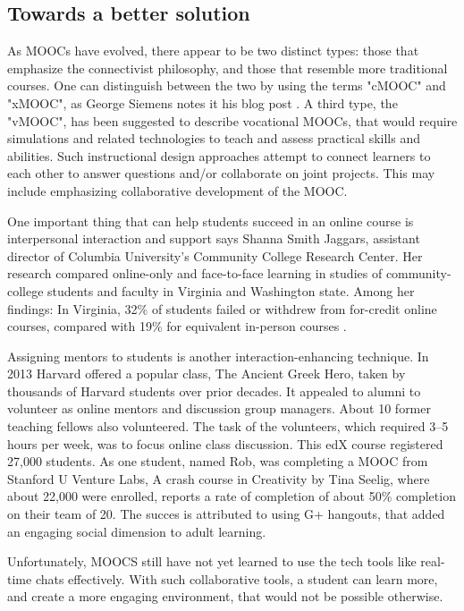 \subsection{Towards a better solution}
As MOOCs have evolved, there appear to be two distinct types: those that
emphasize the connectivist philosophy, and those that resemble more traditional
courses. One can distinguish between the two by using the terms "cMOOC" and
"xMOOC", as George Siemens notes it his blog post \citep{moocs_are_a_platform}.
A third type, the "vMOOC", has been suggested to describe
vocational MOOCs, that would require simulations and related technologies to
teach and assess practical skills and abilities.
Such instructional design approaches attempt to connect learners to each other
to answer questions and/or collaborate on joint projects. This may include
emphasizing collaborative development of the MOOC.

One important thing that can help students succeed in an online course is
interpersonal interaction and support says Shanna Smith Jaggars, assistant
director of Columbia University's Community College Research Center. Her
research compared online-only and face-to-face learning in studies of
community-college students and faculty in Virginia and Washington state. Among
her findings: In Virginia, 32\% of students failed or withdrew from for-credit
online courses, compared with 19\% for equivalent in-person courses \citep{early_report_on_moocs}.

Assigning mentors to students is another interaction-enhancing technique.
In 2013 Harvard offered a popular class, The Ancient Greek Hero, taken by
thousands of Harvard students over prior decades. It appealed to alumni to
volunteer as online mentors and discussion group managers. About 10 former
teaching fellows also volunteered. The task of the volunteers, which required
3–5 hours per week, was to focus online class discussion. This edX course registered 27,000 students.
As one student, named Rob, was completing a MOOC  from Stanford U Venture Labs, A crash course in
Creativity by Tina Seelig, where about 22,000 were enrolled, reports a rate of
completion of about 50\% completion on their team of 20. The succes is
attributed to using G+ hangouts, that added an engaging social dimension to adult learning.

Unfortunately, MOOCS still have not yet learned to use the tech tools like
real-time chats effectively. With such collaborative tools, a student can learn
more, and create a more engaging environment, that would not be possible otherwise.

